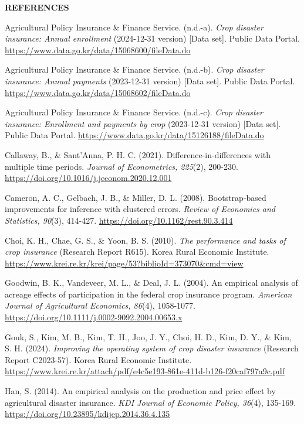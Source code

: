 \clearpage
{\centering\textbf{REFERENCES}\par}
\begin{wordreferences}

Agricultural Policy Insurance \& Finance Service. (n.d.-a). \emph{Crop disaster insurance: Annual enrollment} (2024-12-31 version) [Data set]. Public Data Portal. \url{https://www.data.go.kr/data/15068600/fileData.do}

Agricultural Policy Insurance \& Finance Service. (n.d.-b). \emph{Crop disaster insurance: Annual payments} (2023-12-31 version) [Data set]. Public Data Portal. \url{https://www.data.go.kr/data/15068602/fileData.do}

Agricultural Policy Insurance \& Finance Service. (n.d.-c). \emph{Crop disaster insurance: Enrollment and payments by crop} (2023-12-31 version) [Data set]. Public Data Portal. \url{https://www.data.go.kr/data/15126188/fileData.do}

Callaway, B., \& Sant'Anna, P. H. C. (2021). Difference-in-differences with multiple time periods. \emph{Journal of Econometrics, 225}(2), 200-230. \url{https://doi.org/10.1016/j.jeconom.2020.12.001}

Cameron, A. C., Gelbach, J. B., \& Miller, D. L. (2008). Bootstrap-based improvements for inference with clustered errors. \emph{Review of Economics and Statistics, 90}(3), 414-427. \url{https://doi.org/10.1162/rest.90.3.414}

Choi, K. H., Chae, G. S., \& Yoon, B. S. (2010). \emph{The performance and tasks of crop insurance} (Research Report R615). Korea Rural Economic Institute. \url{https://www.krei.re.kr/krei/page/53?biblioId=373070&cmd=view}

Goodwin, B. K., Vandeveer, M. L., \& Deal, J. L. (2004). An empirical analysis of acreage effects of participation in the federal crop insurance program. \emph{American Journal of Agricultural Economics, 86}(4), 1058-1077. \url{https://doi.org/10.1111/j.0002-9092.2004.00653.x}

Gouk, S., Kim, M. B., Kim, T. H., Joo, J. Y., Choi, H. D., Kim, D. Y., \& Kim, S. H. (2024). \emph{Improving the operating system of crop disaster insurance} (Research Report C2023-57). Korea Rural Economic Institute. \url{https://www.krei.re.kr/attach/pdf/e4c5e193-861e-411d-b126-f20caf797a9c.pdf}

Han, S. (2014). An empirical analysis on the production and price effect by agricultural disaster insurance. \emph{KDI Journal of Economic Policy, 36}(4), 135-169. \url{https://doi.org/10.23895/kdijep.2014.36.4.135}


\end{wordreferences}
